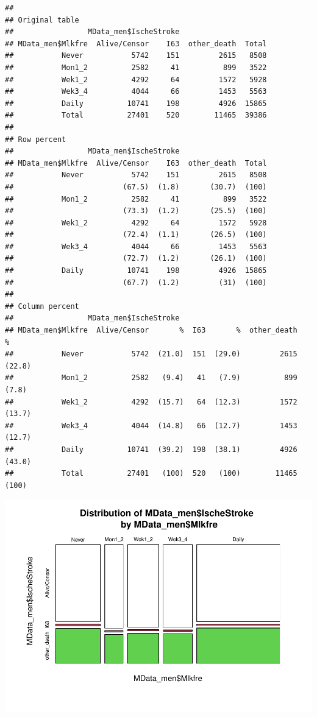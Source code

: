 \documentclass[
]{article}
\begin{document}
\begin{verbatim}
## 
## Original table 
##                 MData_men$IscheStroke
## MData_men$Mlkfre  Alive/Censor    I63  other_death  Total
##           Never           5742    151         2615   8508
##           Mon1_2          2582     41          899   3522
##           Wek1_2          4292     64         1572   5928
##           Wek3_4          4044     66         1453   5563
##           Daily          10741    198         4926  15865
##           Total          27401    520        11465  39386
## 
## Row percent 
##                 MData_men$IscheStroke
## MData_men$Mlkfre  Alive/Censor    I63  other_death  Total
##           Never           5742    151         2615   8508
##                         (67.5)  (1.8)       (30.7)  (100)
##           Mon1_2          2582     41          899   3522
##                         (73.3)  (1.2)       (25.5)  (100)
##           Wek1_2          4292     64         1572   5928
##                         (72.4)  (1.1)       (26.5)  (100)
##           Wek3_4          4044     66         1453   5563
##                         (72.7)  (1.2)       (26.1)  (100)
##           Daily          10741    198         4926  15865
##                         (67.7)  (1.2)         (31)  (100)
## 
## Column percent 
##                 MData_men$IscheStroke
## MData_men$Mlkfre  Alive/Censor       %  I63       %  other_death       %
##           Never           5742  (21.0)  151  (29.0)         2615  (22.8)
##           Mon1_2          2582   (9.4)   41   (7.9)          899   (7.8)
##           Wek1_2          4292  (15.7)   64  (12.3)         1572  (13.7)
##           Wek3_4          4044  (14.8)   66  (12.7)         1453  (12.7)
##           Daily          10741  (39.2)  198  (38.1)         4926  (43.0)
##           Total          27401   (100)  520   (100)        11465   (100)
\end{verbatim}

\includegraphics{traditionalPH_files/figure-latex/unnamed-chunk-31-1.pdf}
\end{document}
